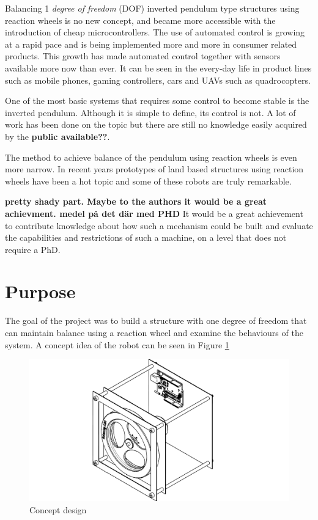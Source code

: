 \documentclass[a4paper,11pt]{kth-mag}
\begin{document}
Balancing 1 \textit{degree of freedom} (DOF) inverted pendulum type structures using reaction wheels is no
new concept, and became more accessible with the introduction of cheap microcontrollers.
The use of automated control is growing at a rapid pace and is being implemented
more and more in consumer related products.  This growth
has made automated control together with sensors available more now than ever. It can be seen in the every-day life in product lines such as mobile phones, gaming controllers, cars and UAVs such as quadrocopters.

One of the most basic systems that requires some control to become stable is the inverted pendulum. 
Although it is simple to define, its control is not. A lot of work has been done on the topic
but there are still no knowledge easily acquired by the \textbf{public available??}. 

The method to achieve balance of the pendulum using reaction wheels is even more narrow. 
In recent years prototypes of land based structures using reaction wheels have been a hot topic and some of these robots are truly remarkable. 

\textbf{pretty shady part. Maybe to the authors it would be a great achievment. medel på det där med PHD }
It would be a great achievement to contribute knowledge about how such a mechanism could be built and evaluate
the capabilities and restrictions of such a machine, on a level that does not require a PhD.


\section{Purpose}
The goal of the project was to build a structure with one degree of freedom that can maintain balance using a reaction wheel and examine the behaviours of the system. A concept idea of the robot can be seen in Figure \ref{Figure: concept idea}
\begin{figure}[!htb] 
\centering
\includegraphics[width = \textwidth]{concept.pdf}
\caption{Concept design}
\label{Figure: concept idea}
\end{figure}
\end{document}
